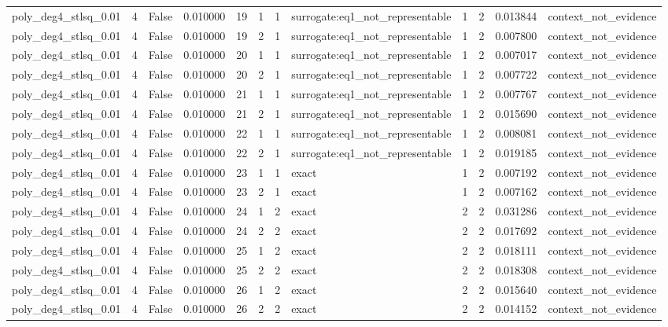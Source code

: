 \begin{tabular}{lrrrrrrlrrrl}
poly\_deg4\_stlsq\_0.01 & 4 & False & 0.010000 & 19 & 1 & 1 & surrogate:eq1\_not\_representable & 1 & 2 & 0.013844 & context\_not\_evidence \\
poly\_deg4\_stlsq\_0.01 & 4 & False & 0.010000 & 19 & 2 & 1 & surrogate:eq1\_not\_representable & 1 & 2 & 0.007800 & context\_not\_evidence \\
poly\_deg4\_stlsq\_0.01 & 4 & False & 0.010000 & 20 & 1 & 1 & surrogate:eq1\_not\_representable & 1 & 2 & 0.007017 & context\_not\_evidence \\
poly\_deg4\_stlsq\_0.01 & 4 & False & 0.010000 & 20 & 2 & 1 & surrogate:eq1\_not\_representable & 1 & 2 & 0.007722 & context\_not\_evidence \\
poly\_deg4\_stlsq\_0.01 & 4 & False & 0.010000 & 21 & 1 & 1 & surrogate:eq1\_not\_representable & 1 & 2 & 0.007767 & context\_not\_evidence \\
poly\_deg4\_stlsq\_0.01 & 4 & False & 0.010000 & 21 & 2 & 1 & surrogate:eq1\_not\_representable & 1 & 2 & 0.015690 & context\_not\_evidence \\
poly\_deg4\_stlsq\_0.01 & 4 & False & 0.010000 & 22 & 1 & 1 & surrogate:eq1\_not\_representable & 1 & 2 & 0.008081 & context\_not\_evidence \\
poly\_deg4\_stlsq\_0.01 & 4 & False & 0.010000 & 22 & 2 & 1 & surrogate:eq1\_not\_representable & 1 & 2 & 0.019185 & context\_not\_evidence \\
poly\_deg4\_stlsq\_0.01 & 4 & False & 0.010000 & 23 & 1 & 1 & exact & 1 & 2 & 0.007192 & context\_not\_evidence \\
poly\_deg4\_stlsq\_0.01 & 4 & False & 0.010000 & 23 & 2 & 1 & exact & 1 & 2 & 0.007162 & context\_not\_evidence \\
poly\_deg4\_stlsq\_0.01 & 4 & False & 0.010000 & 24 & 1 & 2 & exact & 2 & 2 & 0.031286 & context\_not\_evidence \\
poly\_deg4\_stlsq\_0.01 & 4 & False & 0.010000 & 24 & 2 & 2 & exact & 2 & 2 & 0.017692 & context\_not\_evidence \\
poly\_deg4\_stlsq\_0.01 & 4 & False & 0.010000 & 25 & 1 & 2 & exact & 2 & 2 & 0.018111 & context\_not\_evidence \\
poly\_deg4\_stlsq\_0.01 & 4 & False & 0.010000 & 25 & 2 & 2 & exact & 2 & 2 & 0.018308 & context\_not\_evidence \\
poly\_deg4\_stlsq\_0.01 & 4 & False & 0.010000 & 26 & 1 & 2 & exact & 2 & 2 & 0.015640 & context\_not\_evidence \\
poly\_deg4\_stlsq\_0.01 & 4 & False & 0.010000 & 26 & 2 & 2 & exact & 2 & 2 & 0.014152 & context\_not\_evidence \\

\end{tabular}
